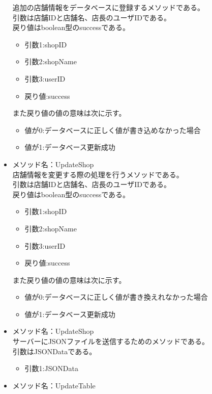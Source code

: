 \documentclass[a4j]{jarticle}
\begin{document}
\begin{itemize}
追加の店舗情報をデータベースに登録するメソッドである。\\
引数は店舗IDと店舗名、店長のユーザIDである。\\
戻り値はboolean型のsuccessである。
	\begin{itemize}
		\item 引数1:shopID
		\item 引数2:shopName
		\item 引数3:userID
		\item 戻り値:success
	\end{itemize}
また戻り値の値の意味は次に示す。
	\begin{itemize}
		\item 値が0:データベースに正しく値が書き込めなかった場合
		\item 値が1:データベース更新成功
	\end{itemize}


\item メソッド名：UpdateShop\\

店舗情報を変更する際の処理を行うメソッドである。\\
引数は店舗IDと店舗名、店長のユーザIDである。\\
戻り値はboolean型のsuccessである。
	\begin{itemize}
		\item 引数1:shopID
		\item 引数2:shopName
		\item 引数3:userID
		\item 戻り値:success
	\end{itemize}
また戻り値の値の意味は次に示す。
	\begin{itemize}
		\item 値が0:データベースに正しく値が書き換えれなかった場合
		\item 値が1:データベース更新成功
	\end{itemize}

\item メソッド名：UpdateShop\\

サーバーにJSONファイルを送信するためのメソッドである。\\
引数はJSONDataである。
	\begin{itemize}
		\item 引数1:JSONData
	\end{itemize}

\item メソッド名：UpdateTable\\


\end{itemize}
\end{document}
